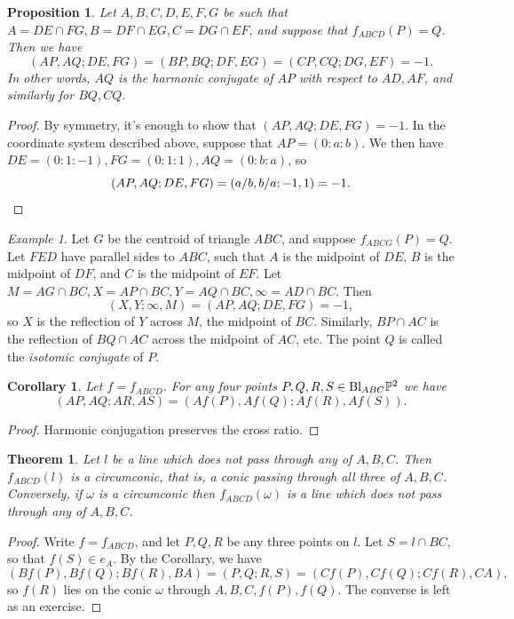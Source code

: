 \documentclass[letterpaper,11pt]{article}
\newtheorem{thm}{Theorem}
\newtheorem{cor}{Corollary}
\newtheorem{prop}{Proposition}
\theoremstyle{definition}
\theoremstyle{remark}
\newtheorem{ex}{Example}
\begin{document}
\begin{prop} Let $A,B,C,D,E,F,G$ be such that $A = DE\cap FG, B = DF\cap EG, C = DG\cap EF$, and suppose that $f_{ABCD}(P) = Q$. Then we have
\[
(AP,AQ;DE,FG) = (BP,BQ;DF,EG) = (CP,CQ;DG,EF) = -1.
\]
In other words, $AQ$ is the harmonic conjugate of $AP$ with respect to $AD, AF$, and similarly for $BQ, CQ$.
\end{prop}
\begin{proof} By symmetry, it's enough to show that $(AP,AQ;DE,FG) = -1$. In the coordinate system described above, suppose that $AP = (0:a:b)$. We then have $DE = (0:1:-1), FG = (0:1:1), AQ = (0:b:a)$, so
\[
(AP,AQ;DE,FG) = (a/b,b/a;-1,1) = -1.\qedhere
\]
\end{proof}

\begin{ex} Let $G$ be the centroid of triangle $ABC$, and suppose $f_{ABCG}(P) = Q$. Let $FED$ have parallel sides to $ABC$, such that $A$ is the midpoint of $DE$, $B$ is the midpoint of $DF$, and $C$ is the midpoint of $EF$. Let $M = AG\cap BC, X = AP \cap BC, Y = AQ \cap BC,\infty = AD\cap BC$. Then
\[
(X,Y;\infty,M) = (AP,AQ;DE,FG) = -1,
\]
so $X$ is the reflection of $Y$ across $M$, the midpoint of $BC$. Similarly, $BP\cap AC$ is the reflection of $BQ\cap AC$ across the midpoint of $AC$, etc. The point $Q$ is called the \emph{isotomic conjugate} of $P$.
\end{ex}

\begin{cor}\label{cremona-cross} Let $f = f_{ABCD}$. For any four points $P,Q,R,S\in \text{\rm Bl}_{ABC}\mathbb{P}^2$ we have
\[
(AP,AQ;AR,AS) = (Af(P),Af(Q);Af(R),Af(S)).
\]
\end{cor}
\begin{proof} Harmonic conjugation preserves the cross ratio.
\end{proof}

\begin{thm}\label{cremona-conic} Let $l$ be a line which does not pass through any of $A,B,C$. Then $f_{ABCD}(l)$ is a \emph{circumconic}, that is, a conic passing through all three of $A,B,C$. Conversely, if $\omega$ is a circumconic then $f_{ABCD}(\omega)$ is a line which does not pass through any of $A,B,C$.
\end{thm}
\begin{proof} Write $f = f_{ABCD}$, and let $P,Q,R$ be any three points on $l$. Let $S = l\cap BC$, so that $f(S) \in e_A$. By the Corollary, we have
\[
(Bf(P),Bf(Q);Bf(R),BA) = (P,Q;R,S) = (Cf(P),Cf(Q);Cf(R),CA),
\]
so $f(R)$ lies on the conic $\omega$ through $A,B,C,f(P),f(Q)$. The converse is left as an exercise.
\end{proof}
\end{document}
